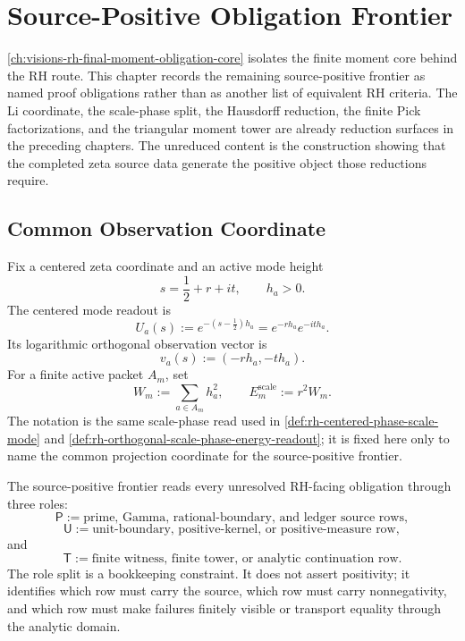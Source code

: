 \chapter{Source-Positive Obligation Frontier}
\label{ch:visions-rh-source-positive-obligation-frontier}

\autoref{ch:visions-rh-final-moment-obligation-core} isolates the finite
moment core behind the RH route. This chapter records the remaining
source-positive frontier as named proof obligations rather than as
another list of equivalent RH criteria. The Li coordinate, the
scale-phase split, the Hausdorff reduction, the finite Pick
factorizations, and the triangular moment tower are already reduction
surfaces in the preceding chapters. The unreduced content is the
construction showing that the completed zeta source data generate the
positive object those reductions require.

\section{Common Observation Coordinate}
\label{sec:rh-source-positive-common-coordinate}

\begin{definition}
\label{def:rh-source-positive-observation-coordinate}
Fix a centered zeta coordinate and an active mode height
$$
s=\frac12+r+it,
\qquad
h_a>0.
$$
The centered mode readout is
$$
U_a(s)
:=
e^{-(s-\frac12)h_a}
=
e^{-rh_a}e^{-ith_a}.
$$
Its logarithmic orthogonal observation vector is
$$
v_a(s):=(-rh_a,-th_a).
$$
For a finite active packet $A_m$, set
$$
W_m:=\sum_{a\in A_m}h_a^2,
\qquad
E_m^{\mathrm{scale}}:=r^2W_m.
$$
The notation is the same scale-phase read used in
\autoref{def:rh-centered-phase-scale-mode} and
\autoref{def:rh-orthogonal-scale-phase-energy-readout}; it is fixed here
only to name the common projection coordinate for the source-positive
frontier.
\end{definition}

\begin{definition}
\label{def:rh-source-positive-triadic-frontier-roles}
The source-positive frontier reads every unresolved RH-facing obligation
through three roles:
$$
\mathsf P
:=
\text{prime, Gamma, rational-boundary, and ledger source rows},
$$
$$
\mathsf U
:=
\text{unit-boundary, positive-kernel, or positive-measure row},
$$
and
$$
\mathsf T
:=
\text{finite witness, finite tower, or analytic continuation row}.
$$
The role split is a bookkeeping constraint. It does not assert
positivity; it identifies which row must carry the source, which row must
carry nonnegativity, and which row must make failures finitely visible or
transport equality through the analytic domain.
\end{definition}

